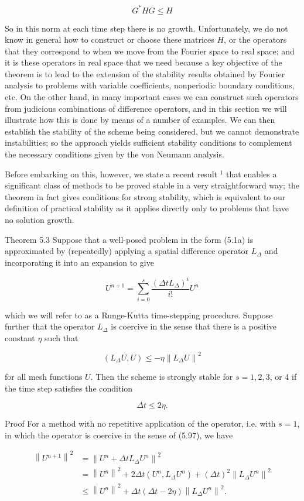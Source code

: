 \documentclass[10pt]{article}
\begin{document}
\[
G^{*} H G \leq H
\]

So in this norm at each time step there is no growth. Unfortunately, we do not know in general how to construct or choose these matrices \(H\), or the operators that they correspond to when we move from the Fourier space to real space; and it is these operators in real space that we need because a key objective of the theorem is to lead to the extension of the stability results obtained by Fourier analysis to problems with variable coefficients, nonperiodic boundary conditions, etc. On the other hand, in many important cases we can construct such operators from judicious combinations of difference operators, and in this section we will illustrate how this is done by means of a number of examples. We can then establish the stability of the scheme being considered, but we cannot demonstrate instabilities; so the approach yields sufficient stability conditions to complement the necessary conditions given by the von Neumann analysis.

Before embarking on this, however, we state a recent result \({ }^{1}\) that enables a significant class of methods to be proved stable in a very straightforward way; the theorem in fact gives conditions for strong stability, which is equivalent to our definition of practical stability as it applies directly only to problems that have no solution growth.

Theorem 5.3 Suppose that a well-posed problem in the form (5.1a) is approximated by (repeatedly) applying a spatial difference operator \(L_{\Delta}\) and incorporating it into an expansion to give

\[
U^{n+1}=\sum_{i=0}^{s} \frac{\left(\Delta t L_{\Delta}\right)^{i}}{i!} U^{n}
\]

which we will refer to as a Runge-Kutta time-stepping procedure. Suppose further that the operator \(L_{\Delta}\) is coercive in the sense that there is a positive constant \(\eta\) such that

\[
\left(L_{\Delta} U, U\right) \leq-\eta\left\|L_{\Delta} U\right\|^{2}
\]

for all mesh functions \(U\). Then the scheme is strongly stable for \(s= 1,2,3\), or 4 if the time step satisfies the condition

\[
\Delta t \leq 2 \eta .
\]

Proof For a method with no repetitive application of the operator, i.e. with \(s=1\), in which the operator is coercive in the sense of (5.97), we have

\[
\begin{aligned}
\left\|U^{n+1}\right\|^{2} & =\left\|U^{n}+\Delta t L_{\Delta} U^{n}\right\|^{2} \\
& =\left\|U^{n}\right\|^{2}+2 \Delta t\left(U^{n}, L_{\Delta} U^{n}\right)+(\Delta t)^{2}\left\|L_{\Delta} U^{n}\right\|^{2} \\
& \leq\left\|U^{n}\right\|^{2}+\Delta t(\Delta t-2 \eta)\left\|L_{\Delta} U^{n}\right\|^{2} .
\end{aligned}
\]
\end{document}
